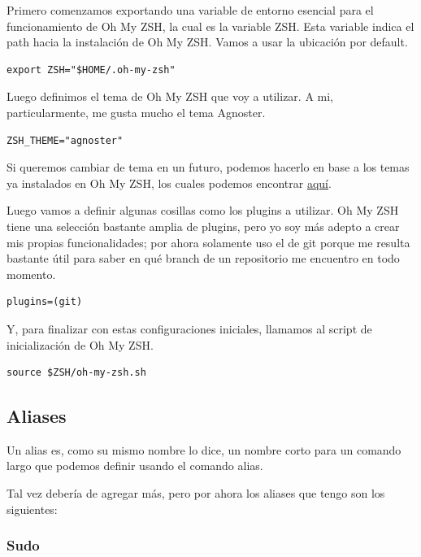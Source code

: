 \documentclass[11pt]{article}
\begin{document}
Primero comenzamos exportando una variable de entorno esencial para el funcionamiento de Oh My ZSH, la cual es la variable ZSH. Esta variable indica el path hacia la instalación de Oh My ZSH. Vamos a usar la ubicación por default.

\begin{verbatim}
export ZSH="$HOME/.oh-my-zsh"
\end{verbatim}

Luego definimos el tema de Oh My ZSH que voy a utilizar. A mi, particularmente, me gusta mucho el tema Agnoster.

\begin{verbatim}
ZSH_THEME="agnoster"
\end{verbatim}

Si queremos cambiar de tema en un futuro, podemos hacerlo en base a los temas ya instalados en Oh My ZSH, los cuales podemos encontrar \href{https://github.com/ohmyzsh/ohmyzsh/wiki/Themes}{aquí}.

Luego vamos a definir algunas cosillas como los plugins a utilizar. Oh My ZSH tiene una selección bastante amplia de plugins, pero yo soy más adepto a crear mis propias funcionalidades; por ahora solamente uso el de git porque me resulta bastante útil para saber en qué branch de un repositorio me encuentro en todo momento.

\begin{verbatim}
plugins=(git)
\end{verbatim}

Y, para finalizar con estas configuraciones iniciales, llamamos al script de inicialización de Oh My ZSH.

\begin{verbatim}
source $ZSH/oh-my-zsh.sh

\end{verbatim}
\subsection{Aliases}
\label{sec:orgabe89b1}

Un alias es, como su mismo nombre lo dice, un nombre corto para un comando largo que podemos definir usando el comando alias.

Tal vez debería de agregar más, pero por ahora los aliases que tengo son los siguientes:
\subsubsection{Sudo}
\label{sec:org5cf194e}
\end{document}
